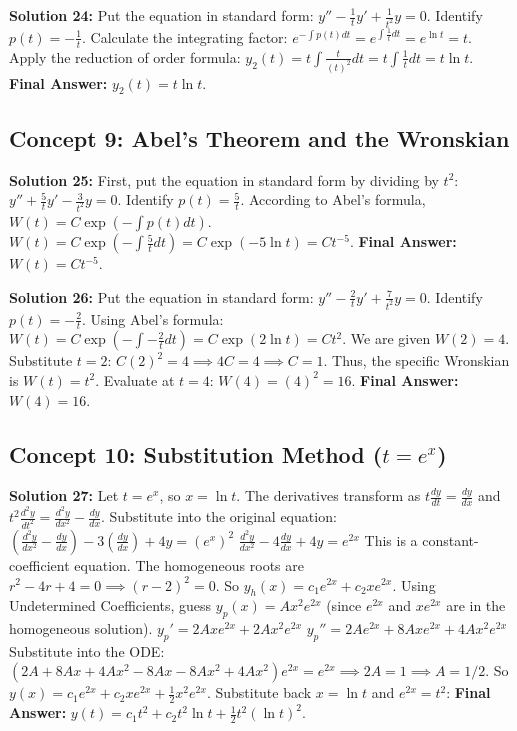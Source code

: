 \documentclass[11pt]{article}
\begin{document}
\textbf{Solution 24:}
Put the equation in standard form: $y'' - \frac{1}{t}y' + \frac{1}{t^2}y = 0$. Identify $p(t) = -\frac{1}{t}$.
Calculate the integrating factor: $e^{-\int p(t)dt} = e^{\int \frac{1}{t} dt} = e^{\ln t} = t$.
Apply the reduction of order formula:
$y_2(t) = t \int \frac{t}{(t)^2} dt = t \int \frac{1}{t} dt = t \ln t$.
\textbf{Final Answer:} $y_2(t) = t \ln t$.

\subsection*{Concept 9: Abel's Theorem and the Wronskian}

\textbf{Solution 25:}
First, put the equation in standard form by dividing by $t^2$: $y'' + \frac{5}{t}y' - \frac{3}{t^2}y = 0$.
Identify $p(t) = \frac{5}{t}$.
According to Abel's formula, $W(t) = C \exp\left(-\int p(t)dt\right)$.
$W(t) = C \exp\left(-\int \frac{5}{t} dt\right) = C \exp(-5\ln t) = C t^{-5}$.
\textbf{Final Answer:} $W(t) = C t^{-5}$.

\textbf{Solution 26:}
Put the equation in standard form: $y'' - \frac{2}{t}y' + \frac{7}{t^2}y = 0$. Identify $p(t) = -\frac{2}{t}$.
Using Abel's formula: $W(t) = C \exp\left(-\int -\frac{2}{t} dt\right) = C \exp(2\ln t) = C t^2$.
We are given $W(2) = 4$. Substitute $t = 2$:
$C(2)^2 = 4 \implies 4C = 4 \implies C = 1$.
Thus, the specific Wronskian is $W(t) = t^2$.
Evaluate at $t = 4$: $W(4) = (4)^2 = 16$.
\textbf{Final Answer:} $W(4) = 16$.

\subsection*{Concept 10: Substitution Method ($t = e^x$)}

\textbf{Solution 27:}
Let $t = e^x$, so $x = \ln t$. The derivatives transform as $t \frac{dy}{dt} = \frac{dy}{dx}$ and $t^2 \frac{d^2y}{dt^2} = \frac{d^2y}{dx^2} - \frac{dy}{dx}$.
Substitute into the original equation:
$\left(\frac{d^2y}{dx^2} - \frac{dy}{dx}\right) - 3\left(\frac{dy}{dx}\right) + 4y = (e^x)^2$
$\frac{d^2y}{dx^2} - 4\frac{dy}{dx} + 4y = e^{2x}$
This is a constant-coefficient equation. The homogeneous roots are $r^2 - 4r + 4 = 0 \implies (r-2)^2 = 0$. So $y_h(x) = c_1 e^{2x} + c_2 x e^{2x}$.
Using Undetermined Coefficients, guess $y_p(x) = A x^2 e^{2x}$ (since $e^{2x}$ and $x e^{2x}$ are in the homogeneous solution).
$y_p' = 2Ax e^{2x} + 2Ax^2 e^{2x}$
$y_p'' = 2A e^{2x} + 8Ax e^{2x} + 4Ax^2 e^{2x}$
Substitute into the ODE:
$(2A + 8Ax + 4Ax^2 - 8Ax - 8Ax^2 + 4Ax^2)e^{2x} = e^{2x} \implies 2A = 1 \implies A = 1/2$.
So $y(x) = c_1 e^{2x} + c_2 x e^{2x} + \frac{1}{2} x^2 e^{2x}$.
Substitute back $x = \ln t$ and $e^{2x} = t^2$:
\textbf{Final Answer:} $y(t) = c_1 t^2 + c_2 t^2 \ln t + \frac{1}{2} t^2 (\ln t)^2$.
\end{document}
